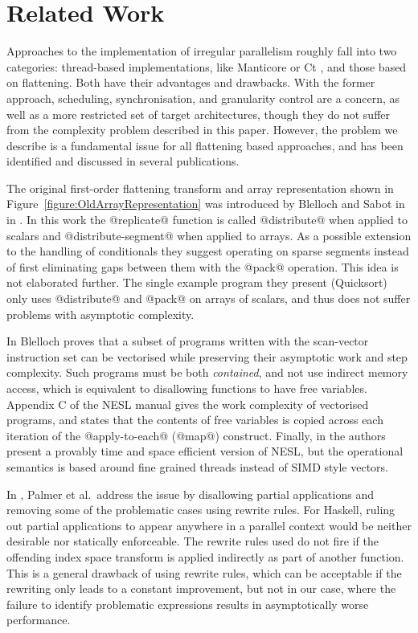 \section{Related Work}
Approaches to the implementation of irregular parallelism roughly fall into two categories: thread-based implementations, like Manticore \cite{Fluet:2008:Manticore} or Ct \cite{ghuloum-etal:Ct}, and those based on flattening. Both have their advantages and drawbacks. With the former approach, scheduling, synchronisation, and granularity control are a concern, as well as a more restricted set of target architectures, though they do not suffer from the complexity problem described in this paper. However, the problem we describe is a fundamental issue for all flattening based approaches, and has been identified and discussed in several publications. 

The original first-order flattening transform and array representation shown in Figure~\ref{figure:OldArrayRepresentation} was introduced by Blelloch and Sabot in in \cite{Blelloch:compiling-collection-oriented-languages}. In this work the @replicate@ function is called @distribute@ when applied to scalars and @distribute-segment@ when applied to arrays. As a possible extension to the handling of conditionals they suggest operating on sparse segments instead of first eliminating gaps between them with the @pack@ operation. This idea is not elaborated further. The single example program they present (Quicksort) only uses @distribute@ and @pack@ on arrays of scalars, and thus does not suffer problems with asymptotic complexity. 

In \cite{Blelloch:vector-models} Blelloch proves that a subset of programs written with the scan-vector instruction set can be vectorised while preserving their asymptotic work and step complexity. Such programs must be both \emph{contained}, and not use indirect memory access, which is equivalent to disallowing functions to have free variables. Appendix C of the NESL manual \cite{Blelloch:nesl-3_1} gives the work complexity of vectorised programs, and states that the contents of free variables is copied across each iteration of the @apply-to-each@ (@map@) construct. Finally, in \cite{Blelloch:provable-type-and-space-efficient} the authors present a provably time and space efficient version of NESL, but the operational semantics is based around fine grained threads instead of SIMD style vectors. 

In \cite{Palmer:work-efficient-nested-data-parallelism}, Palmer et al.\ address the issue by disallowing partial applications and removing some of the problematic cases
using rewrite rules. For Haskell, ruling out partial applications to appear anywhere in a parallel context would be neither  desirable nor statically enforceable. The rewrite rules used do not fire if the offending index space transform is applied indirectly as part of another function. This is a general drawback of using rewrite rules, which can be acceptable if the rewriting only leads to a constant improvement, but not in our case, where the failure to identify problematic expressions results in asymptotically worse performance.

